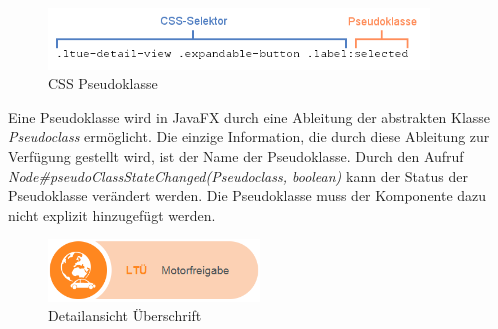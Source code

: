\begin{figure}[H]
 \centering
 \includegraphics[width=0.9\textwidth]{grafiken/pseudoklasse.png}
 \caption{CSS Pseudoklasse}
 \label{fig:cssPseudoclass}
\end{figure}
Eine Pseudoklasse wird in JavaFX durch eine Ableitung der abstrakten Klasse \textit{Pseudoclass} ermöglicht. Die einzige Information, die durch diese Ableitung zur Verfügung gestellt wird, ist der Name der Pseudoklasse. Durch den Aufruf \textit{Node\#{}pseudoClassStateChanged(Pseudoclass, boolean)} kann der Status der Pseudoklasse verändert werden. Die Pseudoklasse muss der Komponente dazu nicht explizit hinzugefügt werden.\par
\begin{figure}[H]
 \centering
 \includegraphics[width=0.5\textwidth]{grafiken/detailPage_bold.png}
 \caption{Detailansicht Überschrift}
 \label{fig:detailPageBold}
\end{figure}
